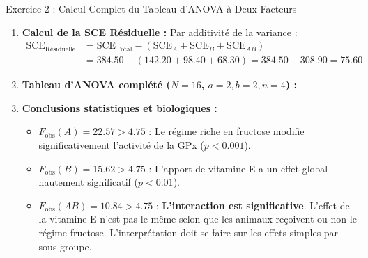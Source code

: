 \documentclass[11pt,a4paper]{article}
\begin{document}
\begin{solutionbox}{Exercice 2 : Calcul Complet du Tableau d'ANOVA à Deux Facteurs}
\begin{enumerate}[label=\textbf{\alph*.}]
  \item \textbf{Calcul de la SCE Résiduelle :}
  Par additivité de la variance :
  \begin{align*}
    \text{SCE}_{\text{Résiduelle}} &= \text{SCE}_{\text{Total}} - (\text{SCE}_A + \text{SCE}_B + \text{SCE}_{AB}) \\
    &= 384.50 - (142.20 + 98.40 + 68.30) = 384.50 - 308.90 = \mathbf{75.60}
  \end{align*}

  \item \textbf{Tableau d'ANOVA complété ($N = 16$, $a=2, b=2, n=4$) :}
  \begin{center}
  \end{center}

  \item \textbf{Conclusions statistiques et biologiques :}
  \begin{itemize}
    \item $F_{\text{obs}}(A) = 22.57 > 4.75$ : Le régime riche en fructose modifie significativement l'activité de la GPx ($p < 0.001$).
    \item $F_{\text{obs}}(B) = 15.62 > 4.75$ : L'apport de vitamine E a un effet global hautement significatif ($p < 0.01$).
    \item $F_{\text{obs}}(AB) = 10.84 > 4.75$ : \textbf{L'interaction est significative}. L'effet de la vitamine E n'est pas le même selon que les animaux reçoivent ou non le régime fructose. L'interprétation doit se faire sur les effets simples par sous-groupe.
  \end{itemize}
\end{enumerate}
\end{solutionbox}
\end{document}
